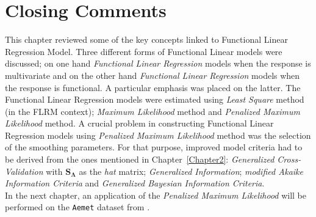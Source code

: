 \section{Closing Comments}
This chapter reviewed some of the key concepts linked to Functional Linear Regression Model. Three different forms of Functional Linear models were discussed; on one hand \textit{Functional Linear Regression} models when the response is multivariate and on the other hand \textit{Functional Linear Regression} models when the response is functional. A particular emphasis was placed on the latter. The Functional Linear Regression models were estimated using \textit{Least Square} method (in the FLRM context); \textit{Maximum Likelihood} method and \textit{Penalized Maximum Likelihood} method. A crucial problem in constructing Functional Linear Regression models using \textit{Penalized Maximum Likelihood} method was the selection of the smoothing parameters. For that purpose, improved model criteria had to be derived from the ones mentioned in Chapter~\ref{Chapter2}: \textit{Generalized Cross-Validation} with $\bm{S}_{\bm{\Lambda}}$ as the \textit{hat} matrix; \textit{Generalized Information}; \textit{modified Akaike Information Criteria} and \textit{Generalized Bayesian Information Criteria}.\\
\textindent In the next chapter, an application of the \textit{Penalized Maximum Likelihood} will be performed on the \texttt{Aemet} dataset from \cite{fda.usc}.